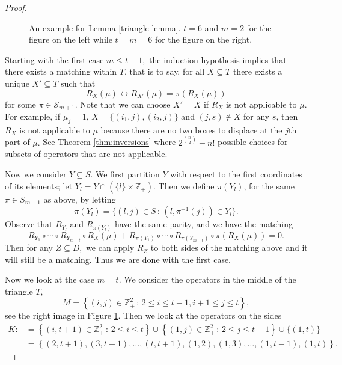 \documentclass[11pt]{amsart}
\begin{document}
\begin{proof}
\begin{figure}
\caption{An example for Lemma \ref{triangle-lemma}. $t=6$ and $m=2$ for the figure on the left while $t=m=6$ for the figure on the right.}
\label{triangle}
\end{figure}


 
Starting with the first case $m \leq t-1,$ the induction hypothesis implies that there exists a matching within $T$, that is to say, for all $X \subseteq T$ there exists a unique $X' \subseteq T$ such that
\begin{equation} \label{match}
 R_X(\mu) \leftrightarrow R_{X'}(\mu) = \pi(R_X(\mu))   
\end{equation}
for some $\pi \in \mathcal{S}_{m+1}.$ Note that we can choose $X'=X$ if $R_X$ is not applicable to $\mu.$ For example, if $\mu_j=1$, $X=\{(i_1,j),(i_2,j)\}$ and $(j,s)\notin X$ for any $s$,  then $R_X$ is not applicable to $\mu$ because there are no two boxes to displace at the $j$th part of $\mu.$ See 
Theorem \ref{thm:inversions} where $2^{\binom{n}{2}}-n!$ possible choices for subsets of operators that are not applicable.

 
Now we consider $Y \subseteq S.$ We first partition $Y$ with respect to the first coordinates of its elements; let $Y_l =Y \cap (\{l\}\times \mathbb{Z}_+).$ Then we define $\pi(Y_l)$, for the same $\pi\in S_{m+1}$ as above, by letting 
\[\pi(Y_l)=\{(l,j) \in S \, : \, (l,\pi^{-1}(j)) \in Y_l\}.\] 
 Observe that $R_{Y_l}$ and $R_{\pi(Y_l)}$ have the same parity, and we have the matching 
    \[R_{Y_1} \circ \cdots \circ R_{Y_{m-t}} \circ R_X(\mu)  +R_{\pi(Y_1)} \circ \cdots \circ R_{\pi(Y_{m-t})}  \circ \pi(R_X(\mu))=0.\]
 Then for any $Z \subseteq D,$ we can apply $R_Z$ to both sides of the matching above and it will still be a matching. Thus we are done with the first case.

Now we look at the case $m=t.$ We consider the operators in the middle of the triangle $T,$
\[M= \left\{(i,j) \in \mathbb{Z}^2_{+} \, : \,  2 \leq i \leq t-1 , i+1 \leq j \leq t \right\},\]
see the right image in Figure \ref{triangle}.
Then we look at the operators on the sides
\begin{align*}
K:&= \left\{ (i,t+1) \in \mathbb{Z}^2_{+}\, : \, 2 \leq i \leq t  \right\} \cup \left \{ (1,j) \in \mathbb{Z}^2_{+} \, : \, 2 \leq j \leq t-1\right\} \cup \{(1,t)\} \\
&= \left\{(2,t+1),(3,t+1),\ldots, (t,t+1),(1,2),(1,3),\ldots, (1,t-1), (1,t) \right \}.
\end{align*}


\end{proof}
\end{document}
